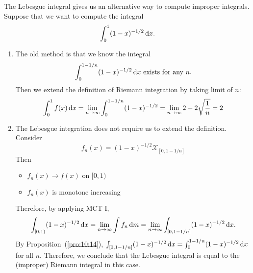 \begin{example}
The Lebesgue integral gives us an alternative way to compute improper integrals.
Suppose that we want to compute the integral
\[
\int_0^1(1-x)^{-1/2}\,\mathrm{d} x.
\]
\begin{enumerate}
\item
The old method is that we know the integral
\[
\int_0^{1-1/n}(1-x)^{-1/2}\,\mathrm{d} x\text{ exists for any $n$}.
\]
Then we extend the definition of Riemann integration by taking limit of $n$:
\[
\int_0^1f(x)\,\mathrm{d} x=\lim_{n\to\infty}\int_0^{1-1/n}(1-x)^{-1/2}
=
\lim_{n\to\infty}2-2\sqrt{\frac{1}{n}}=2
\]
\item
The Lebesgue integration does not require us to extend the definition.
Consider
\[
f_n(x)=(1-x)^{-1/2}\mathcal{X}_{[0,1-1/n]}
\]
Then
\begin{itemize}
\item
$f_n(x)\to f(x)$ on $[0,1)$
\item
$f_n(x)$ is monotone increasing
\end{itemize}
Therefore, by applying MCT I,
\[
\int_{[0,1)}(1-x)^{-1/2}\,\mathrm{d} x=\lim_{n\to\infty}\int f_n\,\mathrm{d} m=\lim_{n\to\infty}\int_{[0,1-1/n]}(1-x)^{-1/2}\,\mathrm{d} x.
\]
By Proposition~(\ref{pro:10:14}), $\int_{[0,1-1/n]}(1-x)^{-1/2}\,\mathrm{d} x=\int_0^{1-1/n}(1-x)^{-1/2}\,\mathrm{d} x$ for all $n$.
Therefore, we conclude that the Lebesgue integral is equal to the (improper) Riemann integral in this case.
\end{enumerate}
\end{example}





























